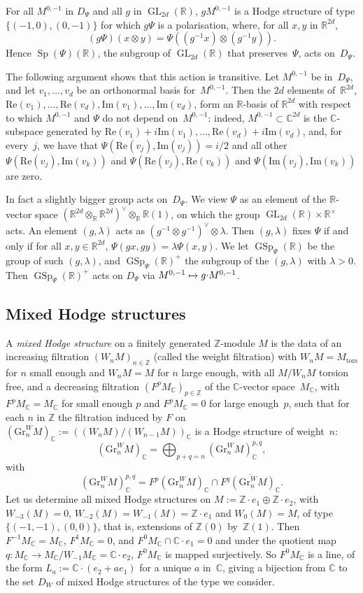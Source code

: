 \documentclass[11pt]{article}
\providecommand{\C}{}
\def\mto{\mathchoice{\longmapsto}{\mapsto}{\mapsto}{\mapsto}}
\let\oldvee\vee
\renewcommand{\vee}{{\scriptscriptstyle\oldvee}}
\theoremstyle{plain}
\theoremstyle{definition}
\numberwithin{equation}{subsection}
\let\ol\overline
\renewcommand{\C}{\mathbb C}
\newcommand{\R}{\mathbb R}
\newcommand{\Z}{\mathbb Z}
\newcommand{\Gr}{\mathrm{Gr}}
\newcommand{\tors}{\mathrm{tors}}
\renewcommand{\Im}{\mathrm{Im}}
\renewcommand{\Re}{\mathrm{Re}}
\DeclareMathOperator{\GL}{GL}
\DeclareMathOperator{\GSp}{GSp}
\DeclareMathOperator{\Sp}{Sp}
\begin{document}
For all $M^{0,-1}$ in $D_\Psi$ and all $g$ in $\GL_{2d}(\R)$,
$gM^{0,-1}$ is a Hodge structure of type $\{(-1,0),(0,-1)\}$ for which
$g\Psi$ is a polarisation, where, for all $x,y$ in $\R^{2d}$,
\[
(g\Psi)(x\otimes y) = \Psi((g^{-1}x)\otimes(g^{-1}y)).
\]
Hence
$\Sp(\Psi)(\R)$, the subgroup of $\GL_{2d}(\R)$ that preserves~$\Psi$,
acts on~$D_\Psi$.

The following argument shows that this action is transitive. Let
$M^{0,-1}$ be in~$D_\Psi$, and let $v_1,\ldots,v_d$ be an orthonormal
basis for~$M^{0,-1}$. Then the $2d$ elements of~$\R^{2d}$,
$\Re(v_1),\ldots,\Re(v_d),\Im(v_1),\ldots,\Im(v_d)$, form an $\R$-basis
of $\R^{2d}$ with respect to which $M^{0,-1}$ and $\Psi$ do not depend
on~$M^{0,-1}$: indeed, $M^{0,-1}\subset\C^{2d}$ is the $\C$-subspace
generated by
$\Re(v_1)+i\Im(v_1),\ldots, \Re(v_d)+i\Im(v_d)$, and, for every~$j$, we have
that $\Psi(\Re(v_j),\Im(v_j))=i/2$ and all other $\Psi(\Re(v_j),\Im(v_k))$
and $\Psi(\Re(v_j),\Re(v_k))$ and $\Psi(\Im(v_j),\Im(v_k))$ are zero.

In fact a slightly bigger group acts on~$D_\Psi$. We view $\Psi$ as
an element of the $\R$-vector space
$(\R^{2d}\otimes_\R\R^{2d})^\vee\otimes_\R\R(1)$, on which the group
$\GL_{2d}(\R)\times\R^\times$ acts. An element $(g,\lambda)$ acts as
$(g^{-1}\otimes g^{-1})^\vee\otimes \lambda$. Then $(g,\lambda)$ fixes
$\Psi$ if and only if for all $x,y\in\R^{2d}$,
$\Psi(gx,gy)=\lambda\Psi(x,y)$. We let $\GSp_\Psi(\R)$ be the group of
such $(g,\lambda)$, and $\GSp_\Psi(\R)^+$ the subgroup of the
$(g,\lambda)$ with $\lambda>0$. Then $\GSp_\Psi(\R)^+$ acts on $D_\Psi$
via $M^{0,-1}\mto g{\cdot}M^{0,-1}$.

\subsection{Mixed Hodge structures}
\label{sec:mhs}
A \emph{mixed Hodge structure} on a finitely generated $\Z$-module $M$
is the data of an increasing filtration $(W_nM)_{n\in\Z}$ (called the
weight filtration) with $W_nM=M_\tors$ for $n$ small enough and
$W_nM=M$ for $n$ large enough, with all $M/W_nM$ torsion free, and a
decreasing filtration $(F^pM_\C)_{p\in\Z}$ of the $\C$-vector space~$M_\C$, with $F^pM_\C=M_\C$ for small enough $p$ and $F^pM_\C=0$ for
large enough~$p$, such that for each $n$ in $\Z$ the filtration
induced by $F$ on $(\Gr^W_nM)_\C:=((W_nM)/(W_{n-1}M))_\C$ is a Hodge
structure of weight~$n$:
\[
(\Gr^W_nM)_\C = \bigoplus_{p+q=n} (\Gr^W_nM)^{p,q}_\C,
\]
with
\[
(\Gr^W_nM)^{p,q}_\C = F^p(\Gr^W_nM)_\C\cap \ol{F^q (\Gr^W_nM)_\C}.
\]
Let us determine all mixed Hodge structures on
$M:=\Z{\cdot}e_1\oplus\Z{\cdot}e_2$, with $W_{-3}(M)=0$,
$W_{-2}(M)=W_{-1}(M)=\Z{\cdot}e_1$ and $W_0(M)=M$, of type
$\{(-1,-1),(0,0)\}$, that is, extensions of $\Z(0)$ by~$\Z(1)$. Then
$F^{-1}M_\C=M_\C$, $F^1M_\C=0$, and $F^0M_\C\cap\C{\cdot}e_1=0$ and
under the quotient map $q\colon M_\C\to M_\C/W_{-1}M_\C=\C{\cdot}e_2$,
$F^0M_\C$ is mapped surjectively. So $F^0M_\C$ is a line, of the form
$L_a:=\C{\cdot}(e_2+ae_1)$ for a unique $a$ in~$\C$, giving a
bijection from $\C$ to the set $D_W$ of mixed Hodge structures of the
type we consider.
\end{document}

